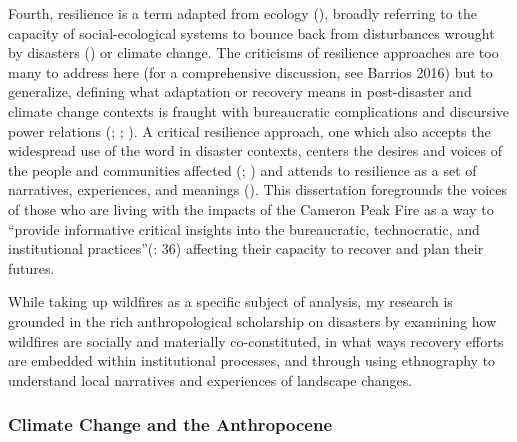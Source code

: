 \documentclass[
]{article}
\begin{document}
Fourth, resilience is a term adapted from ecology (), broadly referring to the capacity of social-ecological systems to bounce back from disturbances wrought by disasters () or climate change. The criticisms of resilience approaches are too many to address here (for a comprehensive discussion, see Barrios 2016) but to generalize, defining what adaptation or recovery means in post-disaster and climate change contexts is fraught with bureaucratic complications and discursive power relations (; ; ). A critical resilience approach, one which also accepts the widespread use of the word in disaster contexts, centers the desires and voices of the people and communities affected (; ) and attends to resilience as a set of narratives, experiences, and meanings (). This dissertation foregrounds the voices of those who are living with the impacts of the Cameron Peak Fire as a way to ``provide informative critical insights into the bureaucratic, technocratic, and institutional practices''(: 36) affecting their capacity to recover and plan their futures.

While taking up wildfires as a specific subject of analysis, my research is grounded in the rich anthropological scholarship on disasters by examining how wildfires are socially and materially co-constituted, in what ways recovery efforts are embedded within institutional processes, and through using ethnography to understand local narratives and experiences of landscape changes.

\subsubsection{Climate Change and the Anthropocene}\label{climate-change-and-the-anthropocene}
\end{document}
